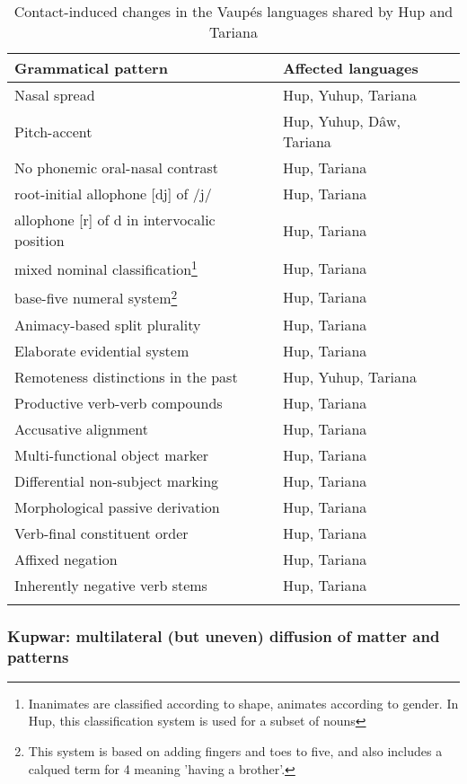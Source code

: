 \documentclass[output=paper,
modfonts
]{langscibook}
\begin{document}
\begin{table}
\caption{Contact-induced changes in the Vaupés languages shared by Hup and Tariana}  
\label{tab-vaupes}
 \begin{tabular}{p{6.7cm}| p{4.3cm}} 
  \lsptoprule
  Grammatical pattern & Affected languages \\ 
  \midrule
Nasal spread & Hup, Yuhup, Tariana \\
Pitch-accent & Hup, Yuhup, Dâw, Tariana \\
No phonemic oral-nasal contrast & Hup, Tariana \\
root-initial allophone [dj] of /j/ & Hup, Tariana \\
allophone [r] of d in intervocalic position & Hup, Tariana \\
mixed nominal classification\footnote{Inanimates are classified according to shape, animates according to gender. In Hup, this classification system is used for a subset of nouns} & Hup, Tariana \\
base-five numeral system\footnote{This system is based on adding fingers and toes to five, and also includes a calqued term for 4 meaning 'having a brother'.} & Hup, Tariana \\
Animacy-based split plurality & Hup, Tariana \\
Elaborate evidential system & Hup, Tariana \\
Remoteness distinctions in the past & Hup, Yuhup, Tariana \\
Productive verb-verb compounds & Hup, Tariana \\
Accusative alignment & Hup, Tariana \\
Multi-functional object marker & Hup, Tariana \\
Differential non-subject marking & Hup, Tariana \\
Morphological passive derivation & Hup, Tariana \\
Verb-final constituent order & Hup, Tariana \\
Affixed negation & Hup, Tariana \\
Inherently negative verb stems & Hup, Tariana \\
\lspbottomrule
 \end{tabular}
\end{table}


\subsubsection*{Kupwar: multilateral (but uneven) diffusion of matter and patterns}
\end{document}
